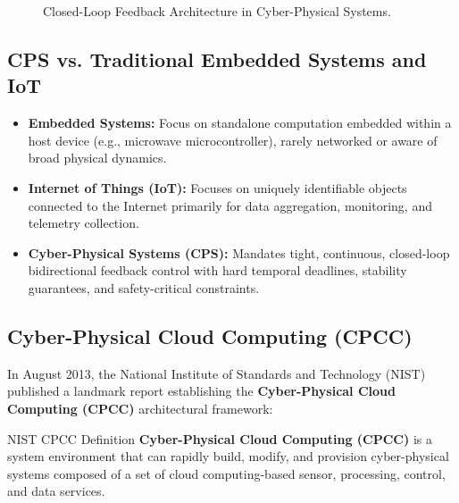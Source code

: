 \begin{figure}[H]
\centering
{}
\caption{Closed-Loop Feedback Architecture in Cyber-Physical Systems.}
\end{figure}

\subsection{CPS vs. Traditional Embedded Systems and IoT}
\begin{itemize}[leftmargin=*]
  \item \textbf{Embedded Systems:} Focus on standalone computation embedded within a host device (e.g., microwave microcontroller), rarely networked or aware of broad physical dynamics.
  \item \textbf{Internet of Things (IoT):} Focuses on uniquely identifiable objects connected to the Internet primarily for data aggregation, monitoring, and telemetry collection.
  \item \textbf{Cyber-Physical Systems (CPS):} Mandates tight, continuous, closed-loop bidirectional feedback control with hard temporal deadlines, stability guarantees, and safety-critical constraints.
\end{itemize}

\subsection{Cyber-Physical Cloud Computing (CPCC)}
In August 2013, the National Institute of Standards and Technology (NIST) published a landmark report establishing the \textbf{Cyber-Physical Cloud Computing (CPCC)} architectural framework:
\begin{defbox}{NIST CPCC Definition}
\textbf{Cyber-Physical Cloud Computing (CPCC)} is a system environment that can rapidly build, modify, and provision cyber-physical systems composed of a set of cloud computing-based sensor, processing, control, and data services.
\end{defbox}

